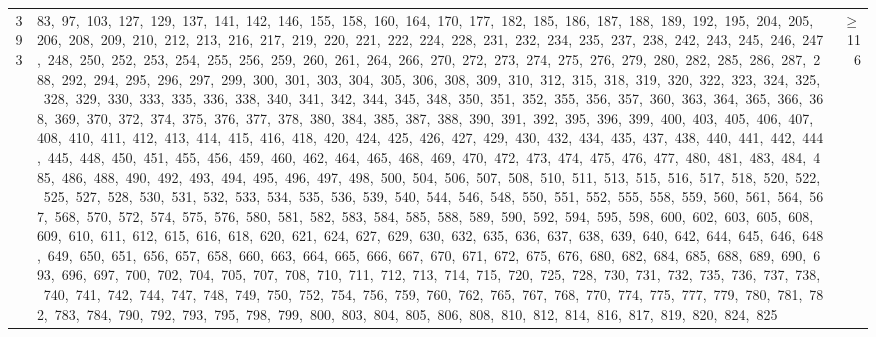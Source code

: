 \begin{longtable}{c|p{}|r}
393 & 83,\ 97,\ 103,\ 127,\ 129,\ 137,\ 141,\ 142,\ 146,\ 155,\ 158,\ 160,\ 164,\ 170,\ 177,\ 182,\ 185,\ 186,\ 187,\ 188,\ 189,\ 192,\ 195,\ 204,\ 205,\ 206,\ 208,\ 209,\ 210,\ 212,\ 213,\ 216,\ 217,\ 219,\ 220,\ 221,\ 222,\ 224,\ 228,\ 231,\ 232,\ 234,\ 235,\ 237,\ 238,\ 242,\ 243,\ 245,\ 246,\ 247,\ 248,\ 250,\ 252,\ 253,\ 254,\ 255,\ 256,\ 259,\ 260,\ 261,\ 264,\ 266,\ 270,\ 272,\ 273,\ 274,\ 275,\ 276,\ 279,\ 280,\ 282,\ 285,\ 286,\ 287,\ 288,\ 292,\ 294,\ 295,\ 296,\ 297,\ 299,\ 300,\ 301,\ 303,\ 304,\ 305,\ 306,\ 308,\ 309,\ 310,\ 312,\ 315,\ 318,\ 319,\ 320,\ 322,\ 323,\ 324,\ 325,\ 328,\ 329,\ 330,\ 333,\ 335,\ 336,\ 338,\ 340,\ 341,\ 342,\ 344,\ 345,\ 348,\ 350,\ 351,\ 352,\ 355,\ 356,\ 357,\ 360,\ 363,\ 364,\ 365,\ 366,\ 368,\ 369,\ 370,\ 372,\ 374,\ 375,\ 376,\ 377,\ 378,\ 380,\ 384,\ 385,\ 387,\ 388,\ 390,\ 391,\ 392,\ 395,\ 396,\ 399,\ 400,\ 403,\ 405,\ 406,\ 407,\ 408,\ 410,\ 411,\ 412,\ 413,\ 414,\ 415,\ 416,\ 418,\ 420,\ 424,\ 425,\ 426,\ 427,\ 429,\ 430,\ 432,\ 434,\ 435,\ 437,\ 438,\ 440,\ 441,\ 442,\ 444,\ 445,\ 448,\ 450,\ 451,\ 455,\ 456,\ 459,\ 460,\ 462,\ 464,\ 465,\ 468,\ 469,\ 470,\ 472,\ 473,\ 474,\ 475,\ 476,\ 477,\ 480,\ 481,\ 483,\ 484,\ 485,\ 486,\ 488,\ 490,\ 492,\ 493,\ 494,\ 495,\ 496,\ 497,\ 498,\ 500,\ 504,\ 506,\ 507,\ 508,\ 510,\ 511,\ 513,\ 515,\ 516,\ 517,\ 518,\ 520,\ 522,\ 525,\ 527,\ 528,\ 530,\ 531,\ 532,\ 533,\ 534,\ 535,\ 536,\ 539,\ 540,\ 544,\ 546,\ 548,\ 550,\ 551,\ 552,\ 555,\ 558,\ 559,\ 560,\ 561,\ 564,\ 567,\ 568,\ 570,\ 572,\ 574,\ 575,\ 576,\ 580,\ 581,\ 582,\ 583,\ 584,\ 585,\ 588,\ 589,\ 590,\ 592,\ 594,\ 595,\ 598,\ 600,\ 602,\ 603,\ 605,\ 608,\ 609,\ 610,\ 611,\ 612,\ 615,\ 616,\ 618,\ 620,\ 621,\ 624,\ 627,\ 629,\ 630,\ 632,\ 635,\ 636,\ 637,\ 638,\ 639,\ 640,\ 642,\ 644,\ 645,\ 646,\ 648,\ 649,\ 650,\ 651,\ 656,\ 657,\ 658,\ 660,\ 663,\ 664,\ 665,\ 666,\ 667,\ 670,\ 671,\ 672,\ 675,\ 676,\ 680,\ 682,\ 684,\ 685,\ 688,\ 689,\ 690,\ 693,\ 696,\ 697,\ 700,\ 702,\ 704,\ 705,\ 707,\ 708,\ 710,\ 711,\ 712,\ 713,\ 714,\ 715,\ 720,\ 725,\ 728,\ 730,\ 731,\ 732,\ 735,\ 736,\ 737,\ 738,\ 740,\ 741,\ 742,\ 744,\ 747,\ 748,\ 749,\ 750,\ 752,\ 754,\ 756,\ 759,\ 760,\ 762,\ 765,\ 767,\ 768,\ 770,\ 774,\ 775,\ 777,\ 779,\ 780,\ 781,\ 782,\ 783,\ 784,\ 790,\ 792,\ 793,\ 795,\ 798,\ 799,\ 800,\ 803,\ 804,\ 805,\ 806,\ 808,\ 810,\ 812,\ 814,\ 816,\ 817,\ 819,\ 820,\ 824,\ 825 & $\ge$ 116 \\

\end{longtable}
